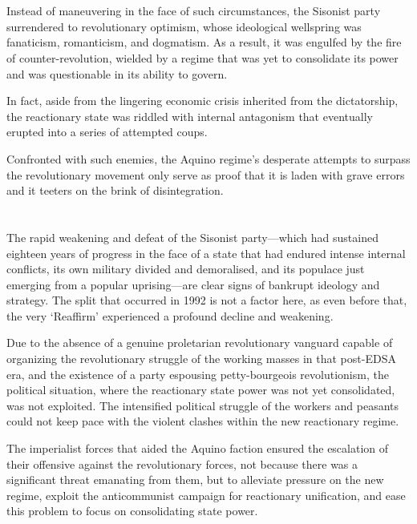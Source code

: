 \section{}
Instead of maneuvering in the face of such circumstances,
the Sisonist party surrendered to revolutionary optimism, 
whose ideological wellspring was fanaticism, romanticism, and dogmatism. 
As a result, it was engulfed by the fire of counter-revolution, 
wielded by a regime that was yet to consolidate its power
and was questionable in its ability to govern.

In fact, 
aside from the lingering economic crisis inherited from the dictatorship, 
the reactionary state was riddled with internal antagonism 
that eventually erupted into a series of attempted coups.

Confronted with such enemies, 
the Aquino regime's desperate attempts 
to surpass the revolutionary movement only 
serve as proof that it is laden with grave errors 
and it teeters on the brink of disintegration.                    


\section{}
The rapid weakening and defeat of the Sisonist party---which 
had sustained eighteen years of progress
in the face of a state that had endured intense internal conflicts,
its own military divided and demoralised, 
and its populace just emerging from a popular uprising---are 
clear signs of bankrupt ideology and strategy.
The split that occurred in 1992 is not a factor here, 
as even before that, the very `Reaffirm' experienced 
a profound decline and weakening.

Due to the absence of a genuine proletarian revolutionary vanguard 
capable of organizing the revolutionary struggle of the working masses 
in that post-EDSA era, 
and the existence of a party espousing petty-bourgeois revolutionism, 
the political situation, where the reactionary state power was 
not yet consolidated, was not exploited. 
The intensified political struggle of the workers and peasants could not 
keep pace with the violent clashes within the new reactionary regime.

The imperialist forces that aided the Aquino faction ensured 
the escalation of their offensive against the revolutionary forces, 
not because there was a significant threat emanating from them, 
but to alleviate pressure on the new regime, 
exploit the anticommunist campaign for reactionary unification, 
and ease this problem to focus on consolidating state power.


